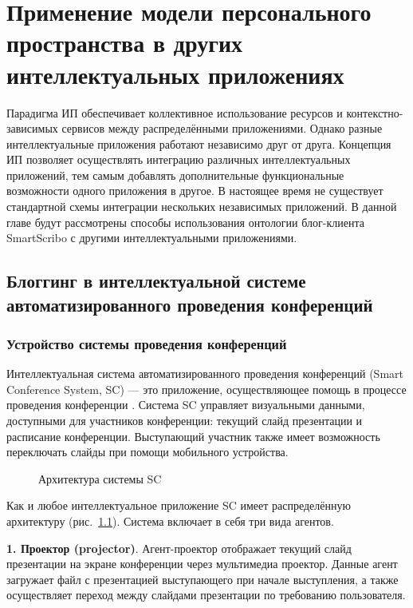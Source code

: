 \chapter{Применение модели персонального пространства в других интеллектуальных приложениях}

Парадигма ИП обеспечивает коллективное использование ресурсов и контекстно-зависимых сервисов между распределёнными приложениями. Однако разные интеллектуальные приложения работают независимо друг от друга.
Концепция ИП позволяет осуществлять интеграцию различных интеллектуальных приложений, тем самым добавлять дополнительные функциональные возможности одного приложения в другое. В настоящее время не существует стандартной схемы интеграции нескольких независимых приложений. В данной главе будут рассмотрены 
способы использования онтологии блог-клиента SmartScribo с другими интеллектуальными приложениями.

\section{Блоггинг в интеллектуальной системе автоматизированного проведения конференций}
\subsection*{Устройство системы проведения конференций}
Интеллектуальная система автоматизированного проведения конференций (Smart Conference System, SC) --- это приложение, осуществляющее помощь в процессе проведения конференции \cite{scs}. Система SC управляет визуальными данными, доступными для участников конференции: текущий слайд презентации и расписание конференции. Выступающий участник также имеет возможность переключать слайды при помощи мобильного устройства.

\begin{figure}[h]
\centerline{
}
\caption{Архитектура системы SC}
\label{scs-arch}
\end{figure}

Как и любое интеллектуальное приложение SC имеет распределённую архитектуру (рис.~\ref{scs-arch}). Система включает в себя три вида агентов.

{\bf 1. Проектор (projector)}.
Агент-проектор отображает текущий слайд презентации на экране конференции через мультимедиа проектор. Данные агент загружает файл с презентацией выступающего при начале выступления, а также осуществляет переход между слайдами презентации по требованию пользователя.


